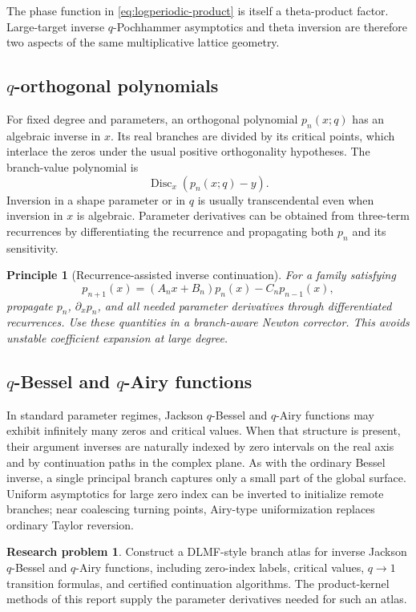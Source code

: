 \documentclass[11pt,oneside]{article}
\theoremstyle{definition}
\theoremstyle{remark}
\theoremstyle{plain}
\newtheorem{principle}[theorem]{Principle}
\theoremstyle{definition}
\newtheorem{researchproblem}[theorem]{Research problem}
\theoremstyle{remark}
\newcommand{\Disc}{\operatorname{Disc}}
\numberwithin{equation}{section}
\numberwithin{figure}{section}
\numberwithin{table}{section}
\let\reportsubsection\subsection
\let\reportsubsubsection\subsubsection
\let\section\reportsubsection
\let\subsection\reportsubsubsection
\begin{document}
The phase function in \eqref{eq:logperiodic-product} is itself a theta-product
factor.  Large-target inverse \(q\)-Pochhammer asymptotics and theta inversion
are therefore two aspects of the same multiplicative lattice geometry.

\section{\texorpdfstring{\(q\)}{q}-orthogonal polynomials}
For fixed degree and parameters, an orthogonal polynomial
\(p_n(x;q)\) has an algebraic inverse in \(x\).  Its real branches are divided
by its critical points, which interlace the zeros under the usual positive
orthogonality hypotheses.  The branch-value polynomial is
\[
 \Disc_x(p_n(x;q)-y).
\]
Inversion in a shape parameter or in \(q\) is usually transcendental even when
inversion in \(x\) is algebraic.  Parameter derivatives can be obtained from
three-term recurrences by differentiating the recurrence and propagating both
\(p_n\) and its sensitivity.

\begin{principle}[Recurrence-assisted inverse continuation]
For a family satisfying
\[
 p_{n+1}(x)=(A_nx+B_n)p_n(x)-C_np_{n-1}(x),
\]
propagate \(p_n\), \(\partial_xp_n\), and all needed parameter derivatives
through differentiated recurrences.  Use these quantities in a branch-aware
Newton corrector.  This avoids unstable coefficient expansion at large degree.
\end{principle}

\section{\texorpdfstring{\(q\)}{q}-Bessel and
\texorpdfstring{\(q\)}{q}-Airy functions}
In standard parameter regimes, Jackson \(q\)-Bessel and \(q\)-Airy functions
may exhibit infinitely many zeros and critical values.  When that structure is
present, their argument inverses are naturally indexed by zero intervals on
the real axis and by continuation paths in the complex plane.  As with the
ordinary Bessel inverse, a single principal branch captures only a small part
of the global surface.  Uniform asymptotics for large zero index can be
inverted to initialize remote branches; near coalescing turning points,
Airy-type uniformization replaces ordinary Taylor reversion.

\begin{researchproblem}
Construct a DLMF-style branch atlas for inverse Jackson \(q\)-Bessel and
\(q\)-Airy functions, including zero-index labels, critical values,
\(q\to1\) transition formulas, and certified continuation algorithms.  The
product-kernel methods of this report supply the parameter derivatives needed
for such an atlas.
\end{researchproblem}
\end{document}
